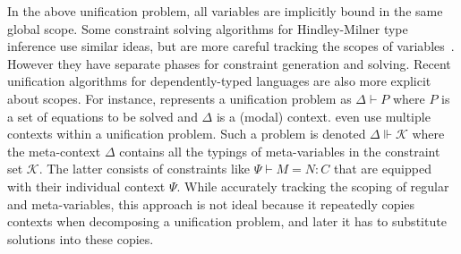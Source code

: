 In the above unification problem, all variables are implicitly bound in the same
global scope. 
Some constraint solving algorithms for Hindley-Milner type
  inference use similar ideas, but are more careful tracking the
  scopes of variables~\cite{remy-attapl}. However they have separate phases for 
constraint generation and solving.
Recent unification algorithms for dependently-typed languages
are also more explicit about scopes. For instance, \citet{Reed2009} represents a unification
problem as $\Delta \vdash P$ where $P$ is a set of equations to be solved and $\Delta$ is
a (modal) context. \citet{Abel2011higher} even use multiple contexts within a unification problem.
Such a problem is denoted $\Delta \Vdash \mathcal{K}$ where the meta-context
$\Delta$ contains all the typings of meta-variables in the constraint set
$\mathcal{K}$. The latter consists of constraints like $\Psi \vdash M = N : C$
that are equipped with their individual context $\Psi$. While accurately tracking
the scoping of regular and meta-variables, this approach is not ideal because it
repeatedly copies contexts when decomposing a unification problem, and
later it has to 
substitute solutions into these copies.

